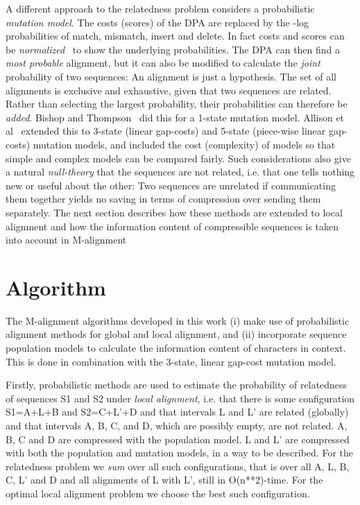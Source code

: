 \documentclass[letterpaper,11pt,oneside]{article}
\begin{document}
A different approach to the relatedness problem
considers a probabilistic {\em mutation model}.
The costs (scores) of the DPA are replaced by the -log probabilities
of match, mismatch, insert and delete.
In fact costs and scores can be {\em normalized}~\cite{Allison93} to show
the underlying probabilities.
The DPA can then find a {\em most probable} alignment, but it can also
be modified to calculate the {\em joint} probability of two sequences:
An alignment is just a hypothesis.
The set of all alignments is exclusive and exhaustive, given that
two sequences are related.
Rather than selecting the largest probability,
their probabilities can therefore be {\em added}.
Bishop and Thompson~\cite{bishop86} did this for a 1-state mutation model.
Allison et al~\cite{Allison92} extended this to 3-state (linear gap-costs)
and 5-state (piece-wise linear gap-costs) mutation models,
and included the cost (complexity) of models so that simple
and complex models can be compared fairly.
Such considerations also give
a natural {\em null-theory} that the sequences are not related,
i.e. that one tells nothing new or useful about the other:
Two sequences are unrelated if
communicating them together yields no saving in terms
of compression over sending them separately.
The next section describes how these methods
are extended to local alignment and how the information
content of compressible sequences is taken into account in M-alignment


\section{Algorithm} \label{sec:alg}

The M-alignment algorithms developed in this work
(i) make use of probabilistic alignment methods
for global and local alignment, and
(ii) incorporate sequence population models to calculate
the information content of characters in context.
This is done in combination with the 3-state, linear gap-cost mutation model.

Firstly,
probabilistic methods are used to estimate the probability of relatedness
of sequences S1 and S2 under {\em local alignment}, i.e. that there is some
configuration S1=A+L+B and S2=C+L'+D and that intervals L and L' are
related (globally) and that intervals A, B, C, and D, which are possibly empty,
are not related.
A, B, C and D are compressed with the population model.
L and L' are compressed with both the population and mutation models,
in a way to be described.
For the relatedness problem we {\em sum} over all such configurations,
that is over all A, L, B, C, L' and D and all alignments of L with L',
still in O(n**2)-time.
For the optimal local alignment problem we choose the best such configuration.
\end{document}
